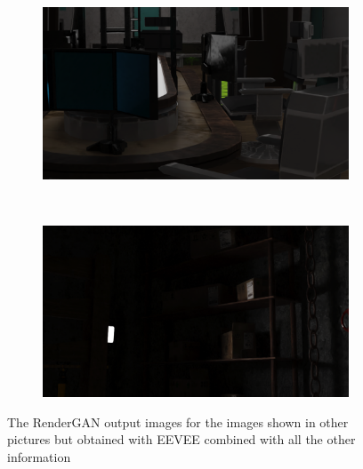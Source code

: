\begin{figure}[h!]
    \centering
    \begin{subfigure}[b]{0.9\textwidth}
     \includegraphics[width=\textwidth]{figures/result/all/s6_camera_60_cycles_RN.png}
     \caption{}\label{subfig:1}
    \end{subfigure}
    \\ \vspace{0.2cm}
    \begin{subfigure}[b]{0.9\textwidth}
     \includegraphics[width=\textwidth]{figures/result/all/s3_camera_17_cycles_RN.png}
     \caption{}
    \end{subfigure}    
    \caption[RenderGAN output]{The RenderGAN output images for the images shown in other pictures but obtained with EEVEE combined with all the other information}
    \label{fig:RenderGAN_images2}
\end{figure}
